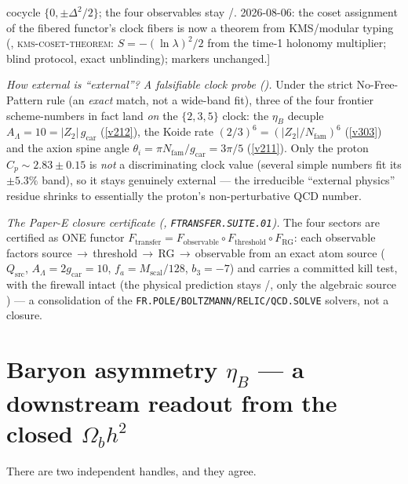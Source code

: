 \documentclass[11pt,a4paper]{article}
\begin{document}
\begin{gapbox}
cocycle $\{0,\pm\Delta^2/2\}$; the four observables stay \mC/\mO.  2026-08-06: the coset assignment of the
fibered functor's clock fibers is now a theorem from KMS/modular typing
(, \textsc{kms-coset-theorem}: $S=-(\ln\lambda)^2/2$ from the time-1
holonomy multiplier; blind protocol, exact unblinding); markers unchanged.]
\par\smallskip\noindent\emph{How external is ``external''? A falsifiable clock probe ().}
Under the strict No-Free-Pattern rule (an \emph{exact} match, not a wide-band fit), three of the four frontier
scheme-numbers in fact land \emph{on} the $\{2,3,5\}$ clock: the $\eta_B$ decuple $A_\Lambda=10=|Z_2|\,g_{\mathrm{car}}$
(\vref{v212}), the Koide rate $(2/3)^6=(|Z_2|/N_{\mathrm{fam}})^6$ (\vref{v303}) and the axion spine angle
$\theta_i=\pi N_{\mathrm{fam}}/g_{\mathrm{car}}=3\pi/5$ (\vref{v211}). Only the proton $C_p\sim2.83\pm0.15$ is \emph{not} a discriminating
clock value (several simple numbers fit its $\pm5.3\%$ band), so it stays genuinely external --- the irreducible
``external physics'' residue shrinks to essentially the proton's non-perturbative QCD number.
\par\smallskip\noindent\emph{The Paper-E closure certificate (, \texttt{FTRANSFER.SUITE.01}).}
The four sectors are certified as ONE functor $F_{\mathrm{transfer}}=F_{\mathrm{observable}}\circ F_{\mathrm{threshold}}\circ F_{\mathrm{RG}}$:
each observable factors source\,$\to$\,threshold\,$\to$\,RG\,$\to$\,observable from an exact atom source ($Q_{\mathrm{src}}$,
$A_\Lambda=2g_{\mathrm{car}}=10$, $f_a=M_{\mathrm{scal}}/128$, $b_3=-7$) and carries a committed kill test, with the firewall
intact (the physical prediction stays \mC/\mO, only the algebraic source \mE) --- a consolidation of the
\texttt{FR.POLE/BOLTZMANN/RELIC/QCD.SOLVE} solvers, not a closure.
\end{gapbox}

\section{Baryon asymmetry $\eta_B$ --- a downstream readout from the closed $\Omega_b h^2$}
There are two independent handles, and they agree.
\end{document}
